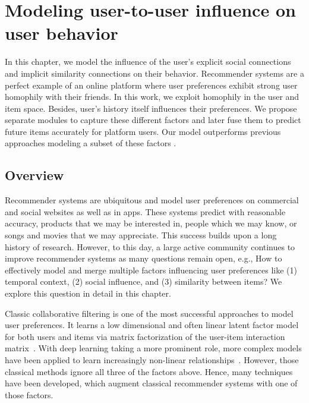 \chapter{Modeling user-to-user influence on user behavior}
\label{chap:social}
In this chapter, we model the influence of the user's explicit social connections and implicit similarity connections on their behavior. Recommender systems are a perfect example of an online platform where user preferences exhibit strong user homophily with their friends. In this work, we exploit homophily in the user and item space. Besides, user's history itself influences their preferences.
We propose separate modules to capture these different factors and later fuse them to predict future items accurately for platform users. Our model outperforms previous approaches modeling a subset of these factors \cite{social}.

\section{Overview}

Recommender systems are ubiquitous and model user preferences on commercial and social websites as well as in apps. These systems predict with reasonable accuracy, products that we may be interested in, people which we may know, or songs and movies that we may appreciate. This success builds upon a long history of research. However, to this day, a large active community continues to improve recommender systems as many questions remain open, e.g., How to effectively model and merge multiple factors influencing user preferences like (1) temporal context, (2) social influence, and (3) similarity between items? We explore this question in detail in this chapter.

Classic collaborative filtering is one of the most successful approaches to model user preferences. It learns a low dimensional and often linear latent factor model for both users and items via matrix factorization of the user-item interaction matrix~\cite{Rendle}. With deep learning taking a more prominent role, more complex models have been applied to learn increasingly non-linear relationships~\cite{NeuMF, CDAE}.
However, those classical methods ignore all three of the factors above.
Hence, many techniques have been developed, which augment classical recommender systems with one of those factors.

